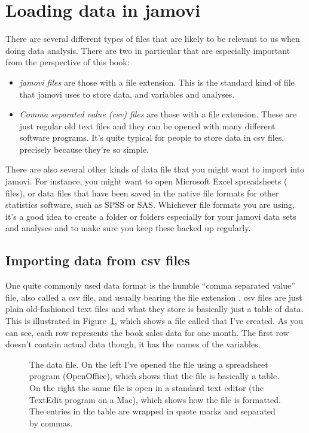 \section{Loading data in jamovi\label{sec:load}}

There are several different types of files that are likely to be relevant to us when doing data analysis. There are two in particular that are especially important from the perspective of this book:
\begin{itemize}
\item {\it jamovi files} are those with a  file extension. This is the standard kind of file that jamovi uses to store data, and variables and analyses. 
\item {\it Comma separated value (csv) files} are those with a  file extension. These are just regular old text files and they can be opened with many different software programs. It's quite typical for people to store data in csv files, precisely because they're so simple.
\end{itemize} 

There are also several other kinds of data file that you might want to import into jamovi. For instance, you might want to open Microsoft Excel spreadsheets ( files), or data files that have been saved in the native file formats for other statistics software, such as SPSS or SAS.  Whichever file formats you are using, it's a good idea to create a folder or folders especially for your jamovi data sets and analyses and to make sure you keep these backed up regularly. 

\subsection{Importing data from csv files}

One quite commonly used data format is the humble ``comma separated value'' file, also called a csv file, and usually bearing the file extension . csv files are just plain old-fashioned text files and what they store is basically just a table of data. This is illustrated in Figure~\ref{fig:booksalescsv}, which shows a file called  that I've created. As you can see, each row represents the book sales data for one month. The first row doesn't contain actual data though, it has the names of the variables.

\begin{figure}
\begin{center}
\caption{The  data file. On the left I've opened the file using a spreadsheet program (OpenOffice), which shows that the file is basically a table. On the right the same file is open in a standard text editor (the TextEdit program on a Mac), which shows how the file is formatted. The entries in the table are wrapped in quote marks and separated by commas.}
\label{fig:booksalescsv}
\end{center}
\end{figure} 

